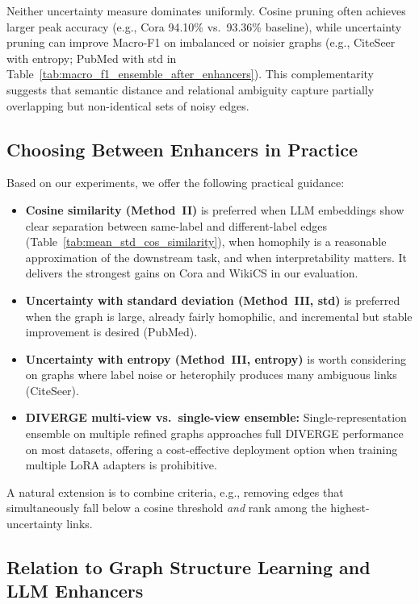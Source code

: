 \documentclass{article}
\begin{document}
Neither uncertainty measure dominates uniformly. Cosine pruning often achieves larger
peak accuracy (e.g., Cora 94.10\% vs.\ 93.36\% baseline), while uncertainty pruning
can improve Macro-F1 on imbalanced or noisier graphs (e.g., CiteSeer with entropy;
PubMed with std in Table~\ref{tab:macro_f1_ensemble_after_enhancers}). This
complementarity suggests that semantic distance and relational ambiguity capture
partially overlapping but non-identical sets of noisy edges.


\subsection{Choosing Between Enhancers in Practice}
\label{sec:disc-when-to-use}

Based on our experiments, we offer the following practical guidance:

\begin{itemize}
\item \textbf{Cosine similarity (Method~II)} is preferred when LLM embeddings show
  clear separation between same-label and different-label edges
  (Table~\ref{tab:mean_std_cos_similarity}), when homophily is a reasonable approximation
  of the downstream task, and when interpretability matters. It delivers the strongest
  gains on Cora and WikiCS in our evaluation.

\item \textbf{Uncertainty with standard deviation (Method~III, std)} is preferred when
  the graph is large, already fairly homophilic, and incremental but stable improvement
  is desired (PubMed).

\item \textbf{Uncertainty with entropy (Method~III, entropy)} is worth considering on
  graphs where label noise or heterophily produces many ambiguous links (CiteSeer).

\item \textbf{DIVERGE multi-view vs.\ single-view ensemble:} Single-representation
  ensemble on multiple refined graphs approaches full DIVERGE performance on most
  datasets, offering a cost-effective deployment option when training multiple LoRA
  adapters is prohibitive.
\end{itemize}

A natural extension is to combine criteria, e.g., removing edges that simultaneously
fall below a cosine threshold \emph{and} rank among the highest-uncertainty links.


\subsection{Relation to Graph Structure Learning and LLM Enhancers}
\label{sec:disc-prior-work}
\end{document}
